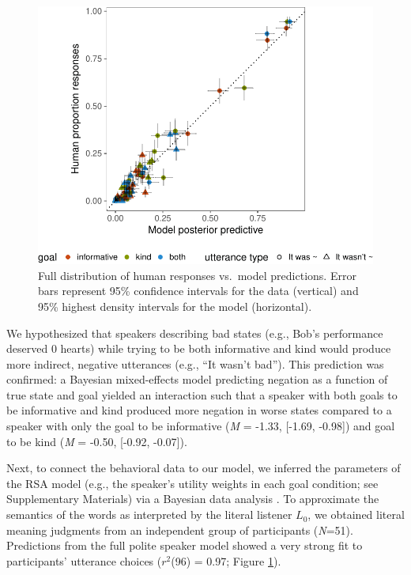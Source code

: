 \documentclass[12pt]{article}
\begin{document}

\begin{figure}
\centering
\includegraphics{polite_manuscript_files/figure-latex/variance-1.pdf}
\caption{\label{fig:variance}Full distribution of human responses vs.~model
predictions. Error bars represent 95\% confidence intervals for the data
(vertical) and 95\% highest density intervals for the model
(horizontal).}
\end{figure}

We hypothesized that speakers describing bad
states (e.g., Bob's performance deserved 0 hearts) while trying to be both
informative and kind would produce more indirect, negative utterances
(e.g., \enquote{It wasn't bad}).
This prediction was confirmed: a Bayesian mixed-effects
model predicting negation as a function of true state and goal yielded
an interaction such that a speaker with both goals to be informative and
kind produced more negation in worse states compared to a speaker with
only the goal to be informative (\emph{M} = -1.33, {[}-1.69, -0.98{]})
and goal to be kind (\emph{M} = -0.50, {[}-0.92, -0.07{]}).

Next, to connect the behavioral data to our model, we inferred the parameters of the RSA model (e.g., the speaker's utility weights in each goal condition; see Supplementary Materials) via a Bayesian data analysis \cite{lee2014}.
To approximate the semantics of the words as interpreted by the literal listener \(L_0\), we obtained literal meaning judgments from an independent group of participants (\emph{N}=51).
Predictions from the full polite speaker model showed a very strong fit to participants' utterance choices (\(r^2\)(96) = 0.97; Figure \ref{fig:variance}).
\end{document}
